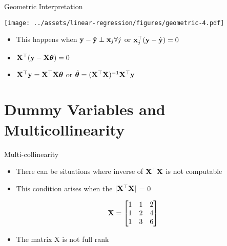 \documentclass{beamer}
\begin{document}
\begin{frame}{Geometric Interpretation}	

    \texttt{[image: ../assets/linear-regression/figures/geometric-4.pdf]}

    


\begin{itemize}[<+->]
\item This happens when $\mathbf{y}-\hat{\mathbf{y}}\perp \mathbf{x}_j \forall j$ or $\mathbf{x}_j^\top(\mathbf{y}-\hat{\mathbf{y}})=0$
\item $\mathbf{X}^\top(\mathbf{y}-\mathbf{X}\boldsymbol{\theta})=0$
\item $\mathbf{X}^\top\mathbf{y} = \mathbf{X}^\top\mathbf{X}\boldsymbol{\theta}$ or $\hat{\boldsymbol{\theta}} =(\mathbf{X}^\top\mathbf{X})^{-1}\mathbf{X}^\top\mathbf{y}$ 
\end{itemize}

\end{frame}




\section{Dummy Variables and Multicollinearity}
\begin{frame}{Multi-collinearity}
\begin{itemize}[<+->]
    \item There can be situations where inverse of $\mathbf{X}^\top\mathbf{X}$ is not computable
    \item This condition arises when the $|\mathbf{X}^\top\mathbf{X}|$ = 0
\end{itemize}
    
    \begin{equation}
    \mathbf{X} = \begin{bmatrix}
    1 & 1& 2\\
    1 & 2& 4\\
    1 & 3& 6\\
    \end{bmatrix}
    \end{equation}
    
    \begin{itemize}[<+->]
        \item The matrix X is not full rank
    \end{itemize} 
    \end{frame}
    
    
    
    
    
\end{document}
